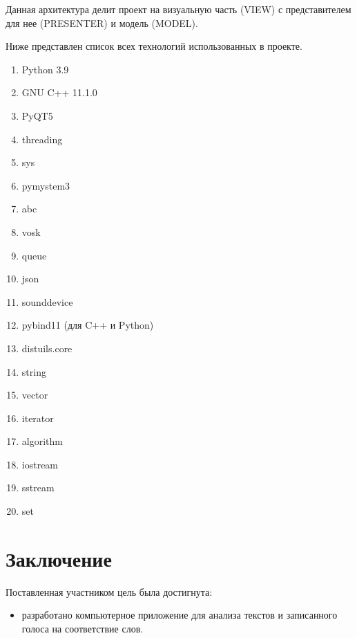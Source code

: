 \documentclass[12pt]{report}
\begin{document}
\begin{figure}[ht!]	
\end{figure}

Данная архитектура делит проект на визуальную часть (VIEW) с представителем для нее (PRESENTER) и модель (MODEL).

Ниже представлен список всех технологий использованных в проекте.
\begin{enumerate}
    \item Python 3.9
    \item GNU C++ 11.1.0
    \item PyQT5
    \item threading
    \item sys
    \item pymystem3
    \item abc
    \item vosk
    \item queue
    \item json
    \item sounddevice
    \item pybind11 (для C++ и Python)
    \item distuils.core
    \item string
    \item vector
    \item iterator
    \item algorithm
    \item iostream
    \item sstream
    \item set
\end{enumerate}

\section{Заключение}

Поставленная участником цель была достигнута:

\begin{itemize}
	\item разработано компьютерное приложение для анализа текстов и записанного голоса на соответствие слов.
\end{itemize}
\end{document}
